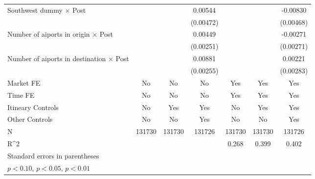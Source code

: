 \begin{table}[htbp]
\begin{tabular}{l*{6}{c}}
\addlinespace
Southwest dummy $\times$ Post&                     &                     &     0.00544         &                     &                     &    -0.00830\sym{*}  \\
                    &                     &                     &   (0.00472)         &                     &                     &   (0.00468)         \\
\addlinespace
Number of aiports in origin $\times$ Post&                     &                     &     0.00449\sym{*}  &                     &                     &    -0.00271         \\
                    &                     &                     &   (0.00251)         &                     &                     &   (0.00271)         \\
\addlinespace
Number of aiports in destination $\times$ Post&                     &                     &     0.00881\sym{***}&                     &                     &     0.00221         \\
                    &                     &                     &   (0.00255)         &                     &                     &   (0.00283)         \\
\midrule
Market FE           &          No         &          No         &          No         &         Yes         &         Yes         &         Yes         \\
Time FE             &          No         &          No         &          No         &         Yes         &         Yes         &         Yes         \\
Itineary Controls   &          No         &         Yes         &         Yes         &          No         &         Yes         &         Yes         \\
Other Controls      &          No         &          No         &         Yes         &          No         &          No         &         Yes         \\
N                   &      131730         &      131730         &      131726         &      131730         &      131730         &      131726         \\
R^2                 &                     &                     &                     &       0.268         &       0.399         &       0.402         \\
\bottomrule
\multicolumn{7}{l}{\footnotesize Standard errors in parentheses}\\
\multicolumn{7}{l}{\footnotesize \sym{*} \(p<0.10\), \sym{**} \(p<0.05\), \sym{***} \(p<0.01\)}\\
\end{tabular}
\end{table}
